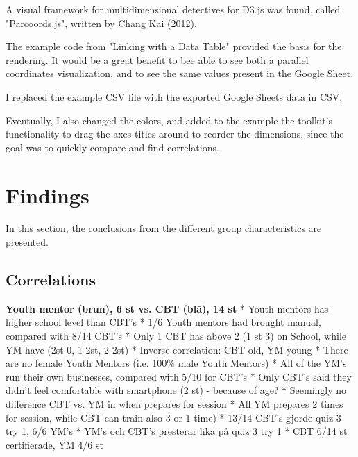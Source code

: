 A visual framework for multidimensional detectives for D3.js was found, called "Parcoords.js", written by Chang Kai (2012).

The example code from "Linking with a Data Table" provided the basis for the rendering. It would be a great benefit to bee able to see both a parallel coordinates visualization, and to see the same values present in the Google Sheet. %

I replaced the example CSV file with the exported Google Sheets data in CSV.

Eventually, I also changed the colors, and added to the example the toolkit's functionality to drag the axes titles around to reorder the dimensions, since the goal was to quickly compare and find correlations.


\section{Findings}

In this section, the conclusions from the different group characteristics are presented.

\subsection{Correlations}

\textbf{Youth mentor (brun), 6 st vs. CBT (blå), 14 st}
* Youth mentors has higher school level than CBT's
* 1/6 Youth mentors had brought manual, compared with 8/14 CBT's
* Only 1 CBT has above 2 (1 st 3) on School, while YM have (2st 0, 1 2st, 2 2st)
* Inverse correlation: CBT old, YM young
* There are no female Youth Mentors (i.e. 100\% male Youth Mentors)
* All of the YM's run their own businesses, compared with 5/10 for CBT's
* Only CBT's said they didn't feel comfortable with smartphone (2 st) - because of age?
* Seemingly no difference CBT vs. YM in when prepares for session
* All YM prepares 2 times for session, while CBT can train also 3 or 1 time)
* 13/14 CBT's gjorde quiz 3 try 1, 6/6 YM's
* YM's och CBT's presterar lika på quiz 3 try 1
* CBT 6/14 st certifierade, YM 4/6 st

